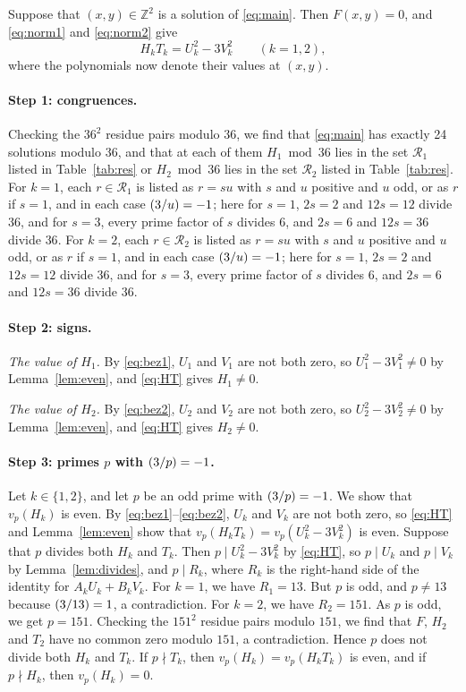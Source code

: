 \documentclass[11pt]{article}
\newcommand{\Z}{\mathbb{Z}}
\newcommand{\leg}[2]{\mathchoice{\biggl(\dfrac{#1}{#2}\biggr)}{(#1/#2)}{(#1/#2)}{(#1/#2)}}
\begin{document}
Suppose that $(x,y)\in\Z^2$ is a solution of \eqref{eq:main}. Then $F(x,y)=0$, and \eqref{eq:norm1} and \eqref{eq:norm2} give
\begin{equation}\label{eq:HT}
H_kT_k=U_k^2-3V_k^2\qquad(k=1,2),
\end{equation}
where the polynomials now denote their values at $(x,y)$.

\paragraph{Step 1: congruences.} Checking the $36^2$ residue pairs modulo $36$, we find that \eqref{eq:main} has exactly 24 solutions modulo $36$, and that at each of them $H_{1}\bmod 36$ lies in the set $\mathcal R_{1}$ listed in Table~\ref{tab:res} or $H_{2}\bmod 36$ lies in the set $\mathcal R_{2}$ listed in Table~\ref{tab:res}. For $k=1$, each $r\in\mathcal R_{1}$ is listed as $r=su$ with $s$ and $u$ positive and $u$ odd, or as $r$ if $s=1$, and in each case $\leg{3}{u}=-1$; here for $s=1$, $2s=2$ and $12s=12$ divide $36$, and for $s=3$, every prime factor of $s$ divides $6$, and $2s=6$ and $12s=36$ divide $36$. For $k=2$, each $r\in\mathcal R_{2}$ is listed as $r=su$ with $s$ and $u$ positive and $u$ odd, or as $r$ if $s=1$, and in each case $\leg{3}{u}=-1$; here for $s=1$, $2s=2$ and $12s=12$ divide $36$, and for $s=3$, every prime factor of $s$ divides $6$, and $2s=6$ and $12s=36$ divide $36$.

\paragraph{Step 2: signs.} \emph{The value of $H_{1}$.} By \eqref{eq:bez1}, $U_{1}$ and $V_{1}$ are not both zero, so $U_{1}^2-3V_{1}^2\neq0$ by Lemma~\ref{lem:even}, and \eqref{eq:HT} gives $H_{1}\neq0$.

\emph{The value of $H_{2}$.} By \eqref{eq:bez2}, $U_{2}$ and $V_{2}$ are not both zero, so $U_{2}^2-3V_{2}^2\neq0$ by Lemma~\ref{lem:even}, and \eqref{eq:HT} gives $H_{2}\neq0$.

\paragraph{Step 3: primes $p$ with $\leg{3}{p}=-1$.} Let $k\in\{1,2\}$, and let $p$ be an odd prime with $\leg{3}{p}=-1$. We show that $v_p(H_k)$ is even. By \eqref{eq:bez1}--\eqref{eq:bez2}, $U_k$ and $V_k$ are not both zero, so \eqref{eq:HT} and Lemma~\ref{lem:even} show that $v_p(H_kT_k)=v_p(U_k^2-3V_k^2)$ is even. Suppose that $p$ divides both $H_k$ and $T_k$. Then $p\mid U_k^2-3V_k^2$ by \eqref{eq:HT}, so $p\mid U_k$ and $p\mid V_k$ by Lemma~\ref{lem:divides}, and $p\mid R_k$, where $R_k$ is the right-hand side of the identity for $A_kU_k+B_kV_k$. For $k=1$, we have $R_{1}=13$. But $p$ is odd, and $p\neq13$ because $\leg{3}{13}=1$, a contradiction. For $k=2$, we have $R_{2}=151$. As $p$ is odd, we get $p=151$. Checking the $151^2$ residue pairs modulo $151$, we find that $F$, $H_{2}$ and $T_{2}$ have no common zero modulo $151$, a contradiction. Hence $p$ does not divide both $H_k$ and $T_k$. If $p\nmid T_k$, then $v_p(H_k)=v_p(H_kT_k)$ is even, and if $p\nmid H_k$, then $v_p(H_k)=0$.
\end{document}
